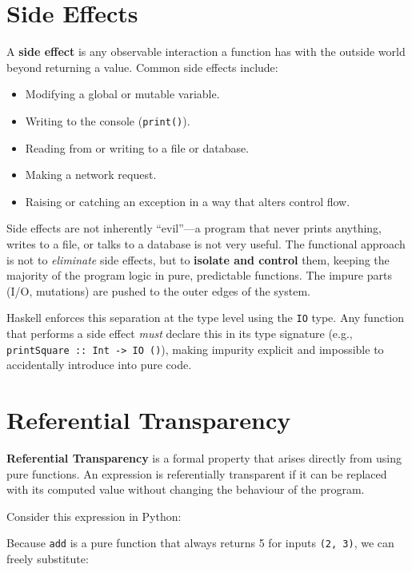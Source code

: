\section{Side Effects}

A \textbf{side effect} is any observable interaction a function has with the outside world beyond returning a value. Common side effects include:

\begin{itemize}
    \item Modifying a global or mutable variable.
    \item Writing to the console (\texttt{print()}).
    \item Reading from or writing to a file or database.
    \item Making a network request.
    \item Raising or catching an exception in a way that alters control flow.
\end{itemize}

Side effects are not inherently ``evil''---a program that never prints anything, writes to a file, or talks to a database is not very useful. The functional approach is not to \textit{eliminate} side effects, but to \textbf{isolate and control} them, keeping the majority of the program logic in pure, predictable functions. The impure parts (I/O, mutations) are pushed to the outer edges of the system.

Haskell enforces this separation at the type level using the \texttt{IO} type. Any function that performs a side effect \textit{must} declare this in its type signature (e.g., \texttt{printSquare :: Int -> IO ()}), making impurity explicit and impossible to accidentally introduce into pure code.

\section{Referential Transparency}

\textbf{Referential Transparency} is a formal property that arises directly from using pure functions. An expression is referentially transparent if it can be replaced with its computed value without changing the behaviour of the program.

Consider this expression in Python:


Because \texttt{add} is a pure function that always returns 5 for inputs \texttt{(2, 3)}, we can freely substitute:


